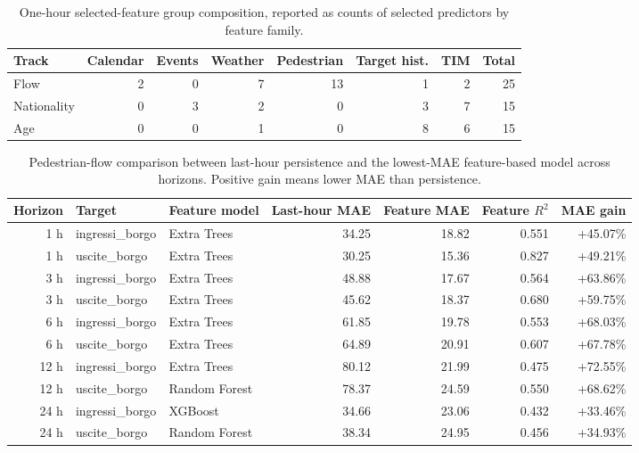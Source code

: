 \begin{table}
\caption{One-hour selected-feature group composition, reported as counts of selected predictors by feature family.}
\label{tab:feature-groups}
\centering
\begingroup
\color{red}
\scriptsize
\begin{tabular}{lrrrrrrr}
\toprule
Track & Calendar & Events & Weather & Pedestrian & Target hist. & TIM & Total \\
\midrule
Flow & 2 & 0 & 7 & 13 & 1 & 2 & 25 \\
Nationality & 0 & 3 & 2 & 0 & 3 & 7 & 15 \\
Age & 0 & 0 & 1 & 0 & 8 & 6 & 15 \\
\bottomrule
\end{tabular}
\endgroup
\end{table}


\begin{table}
\caption{Pedestrian-flow comparison between last-hour persistence and the lowest-MAE feature-based model across horizons. Positive gain means lower MAE than persistence.}
\label{tab:flow-horizon}
\centering
\begingroup
\color{red}
\scriptsize
\begin{tabularx}{\textwidth}{rlXrrrr}
\toprule
Horizon & Target & Feature model & Last-hour MAE & Feature MAE & Feature $R^2$ & MAE gain \\
\midrule
1 h & ingressi\_borgo & Extra Trees & 34.25 & 18.82 & 0.551 & +45.07\% \\
1 h & uscite\_borgo & Extra Trees & 30.25 & 15.36 & 0.827 & +49.21\% \\
3 h & ingressi\_borgo & Extra Trees & 48.88 & 17.67 & 0.564 & +63.86\% \\
3 h & uscite\_borgo & Extra Trees & 45.62 & 18.37 & 0.680 & +59.75\% \\
6 h & ingressi\_borgo & Extra Trees & 61.85 & 19.78 & 0.553 & +68.03\% \\
6 h & uscite\_borgo & Extra Trees & 64.89 & 20.91 & 0.607 & +67.78\% \\
12 h & ingressi\_borgo & Extra Trees & 80.12 & 21.99 & 0.475 & +72.55\% \\
12 h & uscite\_borgo & Random Forest & 78.37 & 24.59 & 0.550 & +68.62\% \\
24 h & ingressi\_borgo & XGBoost & 34.66 & 23.06 & 0.432 & +33.46\% \\
24 h & uscite\_borgo & Random Forest & 38.34 & 24.95 & 0.456 & +34.93\% \\
\bottomrule
\end{tabularx}
\endgroup
\end{table}

